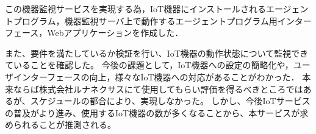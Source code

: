 この機器監視サービスを実現する為，IoT機器にインストールされるエージェントプログラム，機器監視サーバ上で動作するエージェントプログラム用インターフェース，Webアプリケーションを作成した．
\medskip

また、要件を満たしているか検証を行い、IoT機器の動作状態について監視できていることを確認した。
今後の課題として，IoT機器への設定の簡略化や，ユーザインターフェースの向上，様々なIoT機器への対応があることがわかった．
本来ならば株式会社ルナネクサスにて使用してもらい評価を得るべきところではあるが、スケジュールの都合により、実現しなかった。
しかし、今後IoTサービスの普及がより進み、使用するIoT機器の数が多くなることから、本サービスが求められることが推測される。

